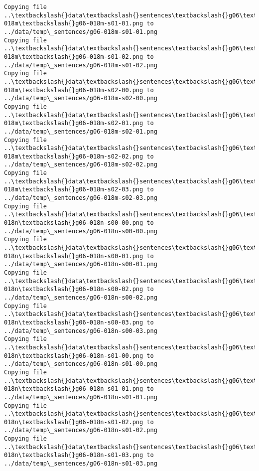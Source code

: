 \documentclass[11pt]{article}
\begin{document}
\begin{Verbatim}[commandchars=\\\{\}]
Copying file ..\textbackslash{}data\textbackslash{}sentences\textbackslash{}g06\textbackslash{}g06-018m\textbackslash{}g06-018m-s01-01.png to
../data/temp\_sentences/g06-018m-s01-01.png
Copying file ..\textbackslash{}data\textbackslash{}sentences\textbackslash{}g06\textbackslash{}g06-018m\textbackslash{}g06-018m-s01-02.png to
../data/temp\_sentences/g06-018m-s01-02.png
Copying file ..\textbackslash{}data\textbackslash{}sentences\textbackslash{}g06\textbackslash{}g06-018m\textbackslash{}g06-018m-s02-00.png to
../data/temp\_sentences/g06-018m-s02-00.png
Copying file ..\textbackslash{}data\textbackslash{}sentences\textbackslash{}g06\textbackslash{}g06-018m\textbackslash{}g06-018m-s02-01.png to
../data/temp\_sentences/g06-018m-s02-01.png
Copying file ..\textbackslash{}data\textbackslash{}sentences\textbackslash{}g06\textbackslash{}g06-018m\textbackslash{}g06-018m-s02-02.png to
../data/temp\_sentences/g06-018m-s02-02.png
Copying file ..\textbackslash{}data\textbackslash{}sentences\textbackslash{}g06\textbackslash{}g06-018m\textbackslash{}g06-018m-s02-03.png to
../data/temp\_sentences/g06-018m-s02-03.png
Copying file ..\textbackslash{}data\textbackslash{}sentences\textbackslash{}g06\textbackslash{}g06-018n\textbackslash{}g06-018n-s00-00.png to
../data/temp\_sentences/g06-018n-s00-00.png
Copying file ..\textbackslash{}data\textbackslash{}sentences\textbackslash{}g06\textbackslash{}g06-018n\textbackslash{}g06-018n-s00-01.png to
../data/temp\_sentences/g06-018n-s00-01.png
Copying file ..\textbackslash{}data\textbackslash{}sentences\textbackslash{}g06\textbackslash{}g06-018n\textbackslash{}g06-018n-s00-02.png to
../data/temp\_sentences/g06-018n-s00-02.png
Copying file ..\textbackslash{}data\textbackslash{}sentences\textbackslash{}g06\textbackslash{}g06-018n\textbackslash{}g06-018n-s00-03.png to
../data/temp\_sentences/g06-018n-s00-03.png
Copying file ..\textbackslash{}data\textbackslash{}sentences\textbackslash{}g06\textbackslash{}g06-018n\textbackslash{}g06-018n-s01-00.png to
../data/temp\_sentences/g06-018n-s01-00.png
Copying file ..\textbackslash{}data\textbackslash{}sentences\textbackslash{}g06\textbackslash{}g06-018n\textbackslash{}g06-018n-s01-01.png to
../data/temp\_sentences/g06-018n-s01-01.png
Copying file ..\textbackslash{}data\textbackslash{}sentences\textbackslash{}g06\textbackslash{}g06-018n\textbackslash{}g06-018n-s01-02.png to
../data/temp\_sentences/g06-018n-s01-02.png
Copying file ..\textbackslash{}data\textbackslash{}sentences\textbackslash{}g06\textbackslash{}g06-018n\textbackslash{}g06-018n-s01-03.png to
../data/temp\_sentences/g06-018n-s01-03.png

\end{Verbatim}
\end{document}
